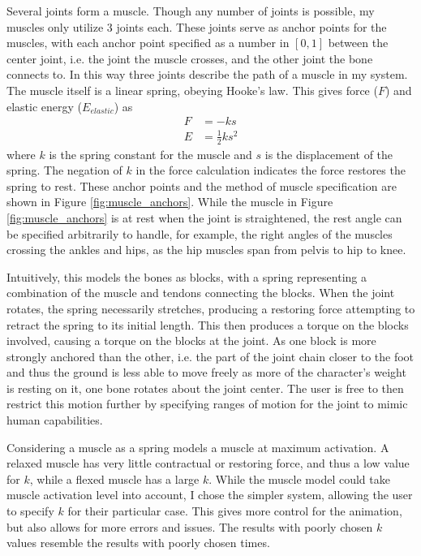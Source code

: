 Several joints form a muscle.  Though any number of joints is possible, my muscles only utilize 3 joints each.  These joints serve as anchor points for the muscles, with each anchor point specified as a number in $[0, 1]$ between the center joint, i.e. the joint the muscle crosses, and the other joint the bone connects to.  In this way three joints describe the path of a muscle in my system.  The muscle itself is a linear spring, obeying Hooke's law.  This gives force ($F$) and elastic energy ($E_{elastic}$) as
\begin{align*}
	F &= -ks \\
	E &= \frac{1}{2} k s^2
\end{align*}
where $k$ is the spring constant for the muscle and $s$ is the displacement of the spring.  The negation of $k$ in the force calculation indicates the force restores the spring to rest.  These anchor points and the method of muscle specification are shown in Figure \ref{fig:muscle_anchors}.  While the muscle in Figure \ref{fig:muscle_anchors} is at rest when the joint is straightened, the rest angle can be specified arbitrarily to handle, for example, the right angles of the muscles crossing the ankles and hips, as the hip muscles span from pelvis to hip to knee.

Intuitively, this models the bones as blocks, with a spring representing a combination of the muscle and tendons connecting the blocks.  When the joint rotates, the spring necessarily stretches, producing a restoring force attempting to retract the spring to its initial length.  This then produces a torque on the blocks involved, causing a torque on the blocks at the joint.  As one block is more strongly anchored than the other, i.e. the part of the joint chain closer to the foot and thus the ground is less able to move freely as more of the character's weight is resting on it, one bone rotates about the joint center.  The user is free to then restrict this motion further by specifying ranges of motion for the joint to mimic human capabilities.

Considering a muscle as a spring models a muscle at maximum activation.  A relaxed muscle has very little contractual or restoring force, and thus a low value for $k$, while a flexed muscle has a large $k$.  While the muscle model could take muscle activation level into account, I chose the simpler system, allowing the user to specify $k$ for their particular case.  This gives more control for the animation, but also allows for more errors and issues.  The results with poorly chosen $k$ values resemble the results with poorly chosen times.

